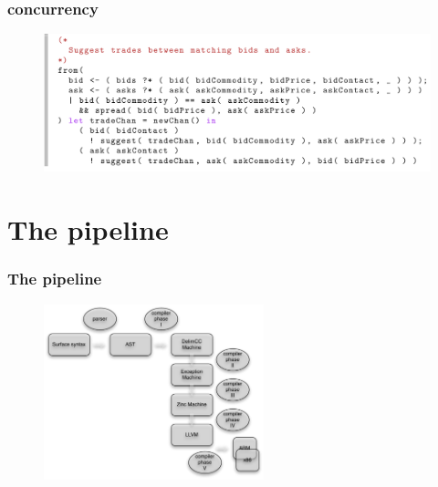 \documentclass{beamer}
\begin{document}
  \begin{frame}
    \frametitle{concurrency}    
    \begin{figure}[ht]
      \begin{center}        
        \includegraphics[width=\textwidth,height=0.7\textheight,keepaspectratio]{pipelinefigures/CodeSamplesMatchingBidsToAsks.pdf}
      \end{center}      
    \end{figure}
  \end{frame}
  \section{The pipeline}
  \begin{frame}
    \frametitle{The pipeline}
    \begin{figure}[ht]
      \begin{center}        
        \includegraphics[height=2in]{pipelinefigures/PipelineImageI.pdf}
      \end{center}      
    \end{figure}
  \end{frame}
\end{document}

